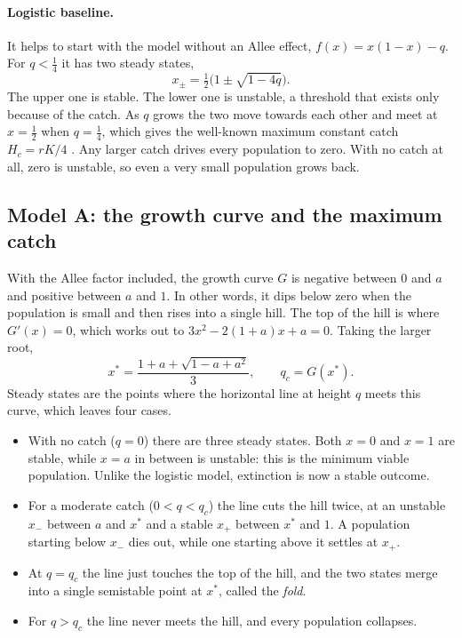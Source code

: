 \paragraph{Logistic baseline.} It helps to start with the model without an Allee effect, $f(x)=x(1-x)-q$. For $q<\tfrac14$ it has two steady states,
\begin{equation}
x_\pm=\tfrac12\bigl(1\pm\sqrt{1-4q}\bigr).
\end{equation}
The upper one is stable. The lower one is unstable, a threshold that exists only because of the catch. As $q$ grows the two move towards each other and meet at $x=\tfrac12$ when $q=\tfrac14$, which gives the well-known maximum constant catch $H_c=rK/4$ \cite{brauer2012mathematical}. Any larger catch drives every population to zero. With no catch at all, zero is unstable, so even a very small population grows back.

\subsection{Model A: the growth curve and the maximum catch}
With the Allee factor included, the growth curve $G$ is negative between $0$ and $a$ and positive between $a$ and $1$. In other words, it dips below zero when the population is small and then rises into a single hill. The top of the hill is where $G'(x)=0$, which works out to $3x^2-2(1+a)x+a=0$. Taking the larger root,
\begin{equation}
x^*=\frac{1+a+\sqrt{1-a+a^2}}{3},\qquad q_c=G(x^*).
\label{eq:fold}
\end{equation}
Steady states are the points where the horizontal line at height $q$ meets this curve, which leaves four cases.
\begin{itemize}
\item With no catch ($q=0$) there are three steady states. Both $x=0$ and $x=1$ are stable, while $x=a$ in between is unstable: this is the minimum viable population. Unlike the logistic model, extinction is now a stable outcome.
\item For a moderate catch ($0<q<q_c$) the line cuts the hill twice, at an unstable $x_-$ between $a$ and $x^*$ and a stable $x_+$ between $x^*$ and $1$. A population starting below $x_-$ dies out, while one starting above it settles at $x_+$.
\item At $q=q_c$ the line just touches the top of the hill, and the two states merge into a single semistable point at $x^*$, called the \emph{fold}.
\item For $q>q_c$ the line never meets the hill, and every population collapses.
\end{itemize}

